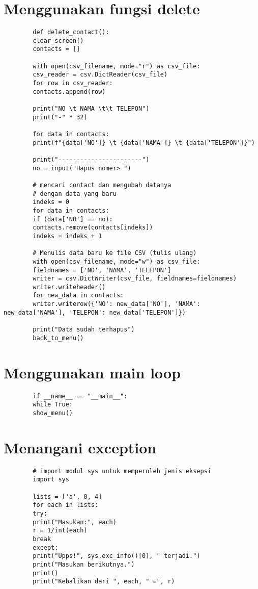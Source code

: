 \documentclass{article}
\begin{document}
	\section{Menggunakan fungsi delete}
	\begin{lstlisting}
		def delete_contact():
		clear_screen()
		contacts = []
		
		with open(csv_filename, mode="r") as csv_file:
		csv_reader = csv.DictReader(csv_file)
		for row in csv_reader:
		contacts.append(row)
		
		print("NO \t NAMA \t\t TELEPON")
		print("-" * 32)
		
		for data in contacts:
		print(f"{data['NO']} \t {data['NAMA']} \t {data['TELEPON']}")
		
		print("-----------------------")
		no = input("Hapus nomer> ")
		
		# mencari contact dan mengubah datanya
		# dengan data yang baru
		indeks = 0
		for data in contacts:
		if (data['NO'] == no):
		contacts.remove(contacts[indeks])
		indeks = indeks + 1
		
		# Menulis data baru ke file CSV (tulis ulang)
		with open(csv_filename, mode="w") as csv_file:
		fieldnames = ['NO', 'NAMA', 'TELEPON']
		writer = csv.DictWriter(csv_file, fieldnames=fieldnames)
		writer.writeheader()
		for new_data in contacts:
		writer.writerow({'NO': new_data['NO'], 'NAMA': new_data['NAMA'], 'TELEPON': new_data['TELEPON']}) 
		
		print("Data sudah terhapus")
		back_to_menu()
	\end{lstlisting}

	\section{Menggunakan main loop}
	\begin{lstlisting}
		if __name__ == "__main__":
		while True:
		show_menu()
	\end{lstlisting}

	\section{Menangani exception}
	\begin{lstlisting}
		# import modul sys untuk memperoleh jenis eksepsi
		import sys
		
		lists = ['a', 0, 4]
		for each in lists:
		try:
		print("Masukan:", each)
		r = 1/int(each)
		break
		except:
		print("Upps!", sys.exc_info()[0], " terjadi.")
		print("Masukan berikutnya.")
		print()
		print("Kebalikan dari ", each, " =", r)
	\end{lstlisting}
\end{document}
